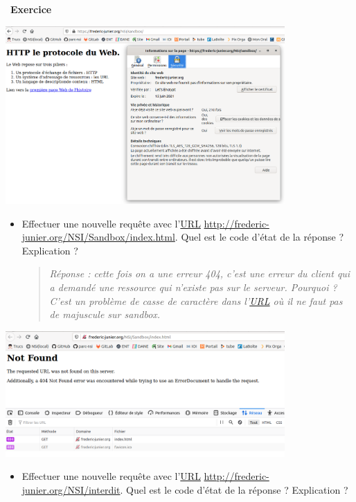 \documentclass[
  11pt,
]{article}
\providecommand{\tightlist}{%
  \setlength{\itemsep}{0pt}\setlength{\parskip}{0pt}}
\newcounter{exo}
\newenvironment{exercice}[1]
{\par \medskip   \addtocounter{exo}{1} \noindent  
\begin{bclogo}[arrondi =0.1,   noborder = true, logo=\bccrayon, marge=4]{~\textbf{Exercice} \textbf{\theexo} {\itshape #1} }  \par}
{
\end{bclogo}
 \par \bigskip }
\begin{document}
\begin{exercice}{}
\begin{enumerate}
  \includegraphics[width=0.8\textwidth,height=\textheight]{images/sandbox_https.png}\\

  \begin{itemize}
  \item
    Effectuer une nouvelle requête avec
    l'\href{https://developer.mozilla.org/fr/docs/Glossaire/URL}{URL}
    \url{http://frederic-junier.org/NSI/Sandbox/index.html}. Quel est le
    code d'état de la réponse ? Explication ?

    \begin{quote}
    \emph{Réponse : cette fois on a une erreur 404, c'est une erreur du
    client qui a demandé une ressource qui n'existe pas sur le serveur.
    Pourquoi ? C'est un problème de casse de caractère dans l'\url{URL}
    où il ne faut pas de majuscule sur sandbox.}
    \end{quote}
  \end{itemize}

  \includegraphics[width=0.8\textwidth,height=\textheight]{images/erreur_404.png}\\

  \begin{itemize}
  \tightlist
  \item
    Effectuer une nouvelle requête avec
    l'\href{https://developer.mozilla.org/fr/docs/Glossaire/URL}{URL}
    \url{http://frederic-junier.org/NSI/interdit}. Quel est le code
    d'état de la réponse ? Explication ?
  \end{itemize}


\end{enumerate}
\end{exercice}
\end{document}
